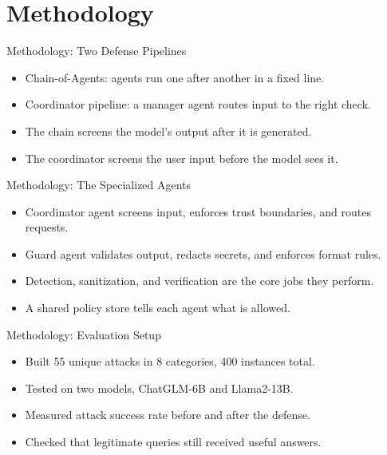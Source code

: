 \documentclass[10pt]{beamer}
\begin{document}
\section{Methodology}
\begin{frame}[allowframebreaks]{Methodology: Two Defense Pipelines}
\begin{itemize}
  \item Chain-of-Agents: agents run one after another in a fixed line.
  \item Coordinator pipeline: a manager agent routes input to the right check.
  \item The chain screens the model's output after it is generated.
  \item The coordinator screens the user input before the model sees it.
\end{itemize}
\end{frame}
\begin{frame}[allowframebreaks]{Methodology: The Specialized Agents}
\begin{itemize}
  \item Coordinator agent screens input, enforces trust boundaries, and routes requests.
  \item Guard agent validates output, redacts secrets, and enforces format rules.
  \item Detection, sanitization, and verification are the core jobs they perform.
  \item A shared policy store tells each agent what is allowed.
\end{itemize}
\end{frame}
\begin{frame}[allowframebreaks]{Methodology: Evaluation Setup}
\begin{itemize}
  \item Built 55 unique attacks in 8 categories, 400 instances total.
  \item Tested on two models, ChatGLM-6B and Llama2-13B.
  \item Measured attack success rate before and after the defense.
  \item Checked that legitimate queries still received useful answers.
\end{itemize}
\end{frame}
\end{document}
